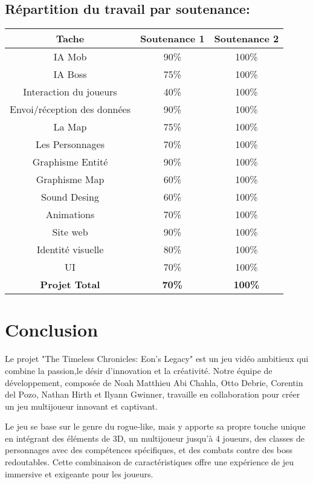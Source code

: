 \documentclass{article}
\begin{document}
\subsection*{Répartition du travail par soutenance:}
\begin{tabular}{|c|c|c|}\hline
    \textbf{Tache} & \textbf{Soutenance 1} & \textbf{Soutenance 2} \\ \hline
    IA Mob & 90\% & 100\% \\ \hline
    IA Boss  & 75\% & 100\% \\ \hline
    Interaction du joueurs  & 40\% & 100\% \\ \hline
    Envoi/réception des données  & 90\% & 100\% \\ \hline
    La Map & 75\% & 100\% \\ \hline
    Les Personnages & 70\% & 100\% \\ \hline
    Graphisme Entité & 90\% & 100\% \\ \hline
    Graphisme Map & 60\% & 100\% \\ \hline
    Sound Desing & 60\% & 100\% \\ \hline
    Animations  & 70\% & 100\% \\ \hline
    Site web & 90\% & 100\% \\ \hline
    Identité visuelle & 80\% & 100\% \\ \hline
    UI & 70\% & 100\% \\ \hline \hline
    \textbf{Projet Total} & \textbf{70\%} & \textbf{100\%} \\ \hline
\end{tabular}
\pagebreak
\section{Conclusion}
Le projet "The Timeless Chronicles: Eon's Legacy" est un jeu vidéo ambitieux qui combine la passion,le désir d'innovation et la créativité. Notre équipe de développement, composée de Noah Matthieu Abi Chahla, Otto Debrie, Corentin del Pozo, Nathan Hirth et Ilyann Gwinner, travaille en collaboration pour créer un jeu multijoueur innovant et captivant.

Le jeu se base sur le genre du rogue-like, mais y apporte sa propre touche unique en intégrant des éléments de 3D, un multijoueur jusqu'à 4 joueurs, des classes de personnages avec des compétences spécifiques, et des combats contre des boss redoutables. Cette combinaison de caractéristiques offre une expérience de jeu immersive et exigeante pour les joueurs.
\end{document}
